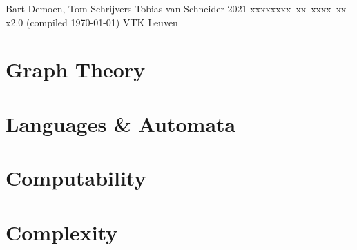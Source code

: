 \documentclass{tstextbook}
\begin{document}
       {Bart Demoen, Tom Schrijvers}
       {Tobias van Schneider}
       {2021}
       {xxxxx}{xxx--xx--xxxx--xx--x}{2.0 (compiled \today)}
       {VTK}
       {Leuven}




\part{Graph Theory}
\graphicspath{{./GraphTheory/figures/}}


\part{Languages \& Automata}
\graphicspath{{./LanguagesAutomata/figures/}}


\part{Computability}
\graphicspath{{./Computability/figures/}}


\part{Complexity}
\graphicspath{{./Complexity/figures/}}

\end{document}
